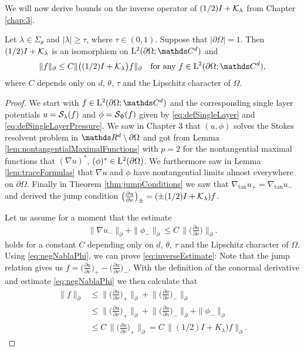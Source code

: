 We will now derive bounds on the inverse operator of $(1/2) I + \mathcal{K}_\lambda$ from Chapter \ref{chap:3}. 

\begin{lem}
  Let $\lambda \in \Sigma_\theta$ and $|\lambda| \geq \tau$, where $\tau \in (0,1)$.
  Suppose that $|\partial\Omega| = 1$.
  Then $(1/2)I + \mathcal{K}_\lambda$ is an isomorphism on $\Ell^2(\partial\Omega; \C^d)$ and
  \begin{align}
    \label{eq:inverseEstimate}
    \| f\|_\partial \leq C \|\big( (1/2) I + \K_\lambda \big) f \|_\partial \quad\text{for any } f \in \Ell^2(\partial\Omega; \C^d),
  \end{align}
  where $C$ depends only on $d$, $\theta$, $\tau$ and the Lipschitz character of $\Omega$.
\end{lem}

\begin{proof}
  We start with $f \in \Ell^2(\partial\Omega; \C^d)$ and the corresponding single layer potentials $u = \mathcal{S}_\lambda(f)$ and $\phi = \mathcal{S}_\Phi(f)$ given by \eqref{eq:defSingleLayer} and \eqref{eq:defSingleLayerPressure}.
  We saw in Chapter 3 that $(u,\phi)$ solves the Stokes resolvent problem in $\R^d \setminus \partial\Omega$ and got from Lemma \ref{lem:nontangentialMaximalFunctions} with $p = 2$ for the nontangential maximal functions that $(\nabla u)^*$, $(\phi)^* \in \mathrm{L}^2(\partial\Omega)$.
  We furthermore saw in Lemma \ref{lem:traceFormulas} that $\nabla u$ and $\phi$ have nontangential limits almost everywhere on $\partial\Omega$. 
  Finally in Theorem \ref{thm:jumpConditions} we saw that $\nabla_{\mathrm{tan}} u_+ = \nabla_{\mathrm{tan}} u_-$ and derived the jump condition $\big(\frac{\partial u}{\partial \nu}\big)_\pm = (\pm (1/2) I + \mathcal{K}_\lambda) f$.

  Let us assume for a moment that the estimate
  \begin{align}
    \label{eq:negNablaPhi}
    \| \nabla u_- \|_\partial + \| \phi_- \|_\partial \leq C \, \Big\| \Big( \frac{\partial u}{\partial \nu} \Big) \Big\|_\partial .
  \end{align}
  holds for a constant $C$ depending only on $d$, $\theta$, $\tau$ and the Lipschitz character of $\Omega$. 
  Using \eqref{eq:negNablaPhi}, we can prove \eqref{eq:inverseEstimate}:
  Note that the jump relation gives us $f = \big(\frac{\partial u}{\partial \nu} \big)_+ -  \big( \frac{\partial u}{\partial \nu} \big)_-$.
  With the definition of the conormal derivative and estimate \eqref{eq:negNablaPhi} we then calculate that
  \begin{align*}
    \| f\|_\partial 
    &\leq  \Big\| \Big( \frac{\partial u}{\partial \nu} \Big)_+ \Big\|_\partial + \Big\| \Big( \frac{\partial u}{\partial \nu} \Big)_- \Big\|_\partial  \\
    &\leq \Big\| \Big( \frac{\partial u}{\partial \nu} \Big)_+  \Big\|_\partial + \Big\| \Big( \frac{\partial u}{\partial n} \Big)_- \Big\|_\partial + \| \phi_- \|_\partial  \\
    &\leq C\, \Big\| \Big( \frac{\partial u}{\partial \nu} \Big)_+ \Big\|_\partial
    = C\, \| (1/2)I + K_\lambda) f\|_\partial.
  \end{align*}


\end{proof}
